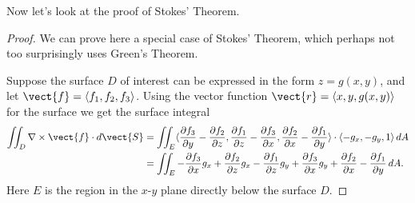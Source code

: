 Now let's look at the proof of Stokes' Theorem.

\begin{proof}
We can prove here a special case of Stokes' Theorem, which perhaps
not too surprisingly uses Green's Theorem.

Suppose the surface $D$ of interest can be expressed in the form
$z=g(x,y)$, and let $\vect{f}=\langle f_1,f_2,f_3\rangle$. Using the vector
function $\vect{r}=\langle x,y,g(x,y)\rangle$ for the surface we get the
surface integral
\begin{align*}
\iint_{D} \nabla\times\vect{f}\cdot d\vect{S}&=
\iint_{E} \langle {\partial f_3 \over \partial y}-{\partial f_2 \over \partial z},{\partial f_1 \over \partial z}-{\partial f_3 \over \partial x},{\partial f_2 \over \partial x}-{\partial f_1 \over \partial y}\rangle\cdot
\langle -g_x,-g_y,1\rangle\,dA	\\
&=\iint_{E} -{\partial f_3 \over \partial x}g_x+{\partial f_2 \over \partial z}g_x-{\partial f_1 \over \partial z}g_y+{\partial f_3 \over \partial x}g_y+{\partial f_2 \over \partial x}-{\partial f_1 \over \partial y}\,dA.
\end{align*}
Here $E$ is the region in the $x$-$y$ plane directly below the surface
$D$. 


\end{proof}
